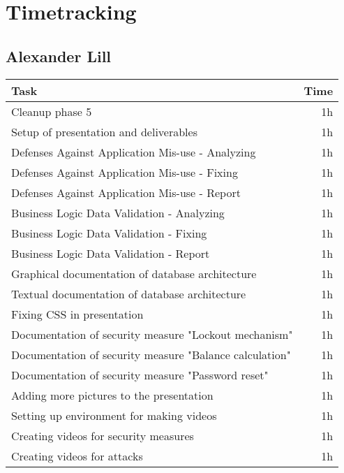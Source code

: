 \chapter{Timetracking}\label{chapter:timetracking}
\section*{Alexander Lill}
\begin{table}[h!tpb]
  \centering
  \begin{tabularx}{\textwidth}{X r}
    \toprule
      Task & Time \\
    \midrule
      Cleanup phase 5 & 1h \\
      Setup of presentation and deliverables & 1h \\
      Defenses Against Application Mis-use - Analyzing & 1h \\
      Defenses Against Application Mis-use - Fixing & 1h \\
      Defenses Against Application Mis-use - Report & 1h \\
      Business Logic Data Validation - Analyzing & 1h \\
      Business Logic Data Validation - Fixing & 1h \\
      Business Logic Data Validation - Report & 1h \\
      Graphical documentation of database architecture & 1h \\
      Textual documentation of database architecture & 1h \\
      Fixing CSS in presentation & 1h \\ %
      Documentation of security measure "Lockout mechanism" & 1h \\
      Documentation of security measure "Balance calculation" & 1h \\
      Documentation of security measure "Password reset" & 1h \\
      Adding more pictures to the presentation & 1h \\
      Setting up environment for making videos & 1h \\
      Creating videos for security measures & 1h \\
      Creating videos for attacks & 1h \\

\end{tabularx}
\end{table}
